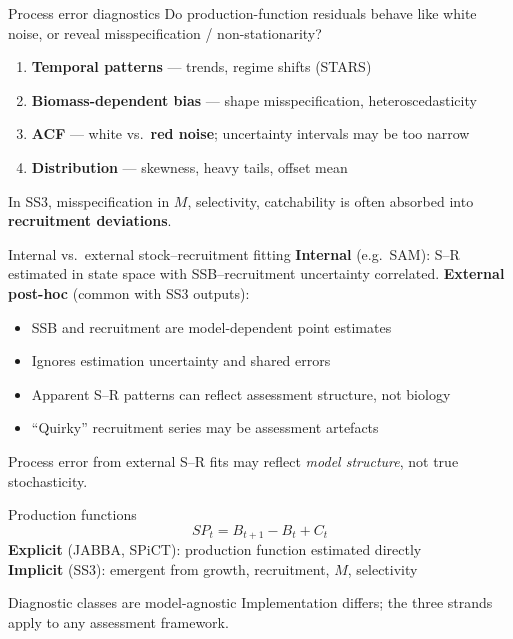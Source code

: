 \documentclass[ignorenonframetext]{beamer}
\begin{document}
\begin{frame}{Process error diagnostics}
  \small
  Do production-function residuals behave like white noise, or reveal misspecification / non-stationarity?
  \begin{enumerate}
    \item \textbf{Temporal patterns} --- trends, regime shifts (STARS)
    \item \textbf{Biomass-dependent bias} --- shape misspecification, heteroscedasticity
    \item \textbf{ACF} --- white vs.\ \textbf{red noise}; uncertainty intervals may be too narrow
    \item \textbf{Distribution} --- skewness, heavy tails, offset mean
  \end{enumerate}
  \vspace{0.3em}
  In SS3, misspecification in $M$, selectivity, catchability is often absorbed into \textbf{recruitment deviations}.
\end{frame}

\begin{frame}{Internal vs.\ external stock--recruitment fitting}
  \small
  \textbf{Internal} (e.g.\ SAM): S--R estimated in state space with SSB--recruitment uncertainty correlated.
  \vspace{0.3em}
  \textbf{External post-hoc} (common with SS3 outputs):
  \begin{itemize}
    \item SSB and recruitment are model-dependent point estimates
    \item Ignores estimation uncertainty and shared errors
    \item Apparent S--R patterns can reflect assessment structure, not biology
    \item ``Quirky'' recruitment series may be assessment artefacts
  \end{itemize}
  \vspace{0.3em}
  Process error from external S--R fits may reflect \emph{model structure}, not true stochasticity.
\end{frame}

\begin{frame}{Production functions}
  \[
    SP_t = B_{t+1} - B_t + C_t
  \]
  \textbf{Explicit} (JABBA, SPiCT): production function estimated directly\\
  \textbf{Implicit} (SS3): emergent from growth, recruitment, $M$, selectivity
  \vspace{0.5em}
  \begin{block}{Diagnostic classes are model-agnostic}
    Implementation differs; the three strands apply to any assessment framework.
  \end{block}
\end{frame}
\end{document}
